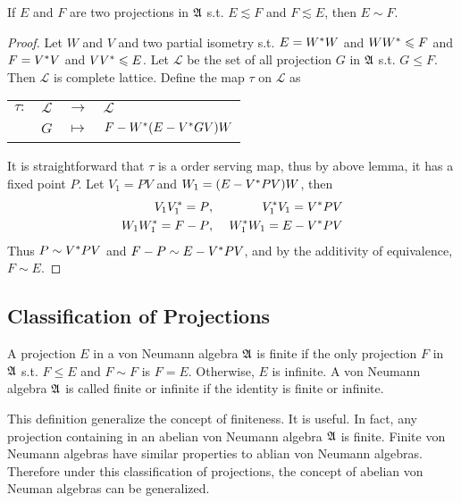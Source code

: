 \begin{thm}
	If $E$ and $F$ are two projections in $\mathfrak{A}$ s.t. $E \lesssim F$ and $F \lesssim E$, then $E \sim F$.
\end{thm}
\begin{proof}
	Let $W$ and $V$ and two partial isometry s.t. $E = W^{*}W$ and $WW^{*} \leqslant F$ and $F = V^{*}V$ and $VV^{*} \leqslant E$. Let $\mathcal{L}$ be the set of all projection $G$ in $\mathfrak{A}$ s.t. $G \leqslant F$. Then $\mathcal{L}$ is complete lattice. Define the map $\tau$ on $\mathcal{L}$ as
	\begin{center}
		\begin{tabular}{l c c l}
			$\tau \colon$ & $\mathcal{L}$ & $\longrightarrow$ & $\mathcal{L}$ \\
			~ & $G$ & $\longmapsto$ & $F-W^{*}(E-V^{*}GV)W$
		\end{tabular}
	\end{center}
	It is straightforward that $\tau$ is a order serving map, thus by above lemma, it has a fixed point $P$. Let $V_1 = PV$ and $W_1 = (E-V^{*}PV)W$, then
	\begin{eqnarray*}
		V_1V_1^{*} = P &,~& V_1^{*}V_1  = V^{*}PV \\
		W_1W_1^{*} = F - P &,~& W_1^{*}W_1 = E - V^{*}PV
	\end{eqnarray*}
	Thus $P \sim V^{*}PV$ and $F - P \sim E - V^{*}PV$, and by the additivity of equivalence, $F \sim E$.
\end{proof}

\subsection{Classification of Projections}

\begin{defn}
	A projection $E$ in a von Neumann algebra $\mathfrak{A}$ is finite if the only projection $F$ in $\mathfrak{A}$ s.t. $F \leqslant E$ and $F \sim F$ is $F = E$. Otherwise, $E$ is infinite. A von Neumann algebra $\mathfrak{A}$ is called finite or infinite if the identity is finite or infinite.
\end{defn}
\begin{rem}
	This definition generalize the concept of finiteness. It is useful. In fact, any projection containing in an abelian von Neumann algebra $\mathfrak{A}$ is finite. Finite von Neumann algebras have similar properties to ablian von Neumann algebras. Therefore under this classification of projections, the concept of abelian von Neuman algebras can be generalized.
\end{rem}

